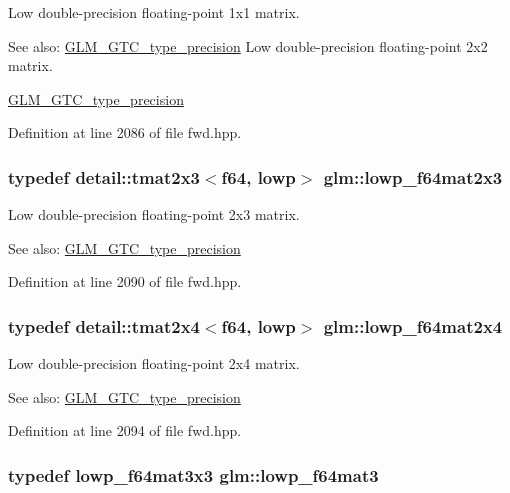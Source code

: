 Low double-precision floating-point 1x1 matrix. \begin{Desc}
\item[See also:]\hyperlink{group__gtc__type__precision}{GLM\_\-GTC\_\-type\_\-precision} Low double-precision floating-point 2x2 matrix. 

\hyperlink{group__gtc__type__precision}{GLM\_\-GTC\_\-type\_\-precision} \end{Desc}


Definition at line 2086 of file fwd.hpp.\hypertarget{group__gtc__type__precision_g2add7d48faba102f53fbad2e14dfed12}{
\subsubsection[lowp\_\-f64mat2x3]{\setlength{\rightskip}{0pt plus 5cm}typedef detail::tmat2x3$<$f64, lowp$>$ {\bf glm::lowp\_\-f64mat2x3}}}
\label{group__gtc__type__precision_g2add7d48faba102f53fbad2e14dfed12}


Low double-precision floating-point 2x3 matrix. \begin{Desc}
\item[See also:]\hyperlink{group__gtc__type__precision}{GLM\_\-GTC\_\-type\_\-precision} \end{Desc}


Definition at line 2090 of file fwd.hpp.\hypertarget{group__gtc__type__precision_g38366c50f2a2755c49110c7fc1441683}{
\subsubsection[lowp\_\-f64mat2x4]{\setlength{\rightskip}{0pt plus 5cm}typedef detail::tmat2x4$<$f64, lowp$>$ {\bf glm::lowp\_\-f64mat2x4}}}
\label{group__gtc__type__precision_g38366c50f2a2755c49110c7fc1441683}


Low double-precision floating-point 2x4 matrix. \begin{Desc}
\item[See also:]\hyperlink{group__gtc__type__precision}{GLM\_\-GTC\_\-type\_\-precision} \end{Desc}


Definition at line 2094 of file fwd.hpp.\hypertarget{group__gtc__type__precision_g4acbda53fb7ff9568c0a2786fad450b8}{
\subsubsection[lowp\_\-f64mat3]{\setlength{\rightskip}{0pt plus 5cm}typedef lowp\_\-f64mat3x3 {\bf glm::lowp\_\-f64mat3}}}
\label{group__gtc__type__precision_g4acbda53fb7ff9568c0a2786fad450b8}


